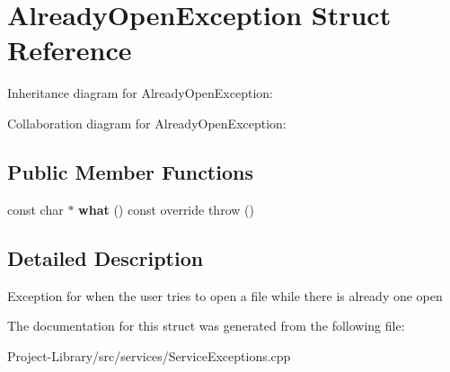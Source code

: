 \hypertarget{structAlreadyOpenException}{}\section{Already\+Open\+Exception Struct Reference}
\label{structAlreadyOpenException}


Inheritance diagram for Already\+Open\+Exception\+:


Collaboration diagram for Already\+Open\+Exception\+:
\subsection*{Public Member Functions}
\begin{DoxyCompactItemize}
\item 
\mbox{\label{structAlreadyOpenException_afb63811442b998afbc6924b9b65eb7f0}} 
const char $\ast$ {\bfseries what} () const override  throw ()
\end{DoxyCompactItemize}


\subsection{Detailed Description}
Exception for when the user tries to open a file while there is already one open 

The documentation for this struct was generated from the following file\+:\begin{DoxyCompactItemize}
\item 
Project-\/\+Library/src/services/Service\+Exceptions.\+cpp\end{DoxyCompactItemize}
